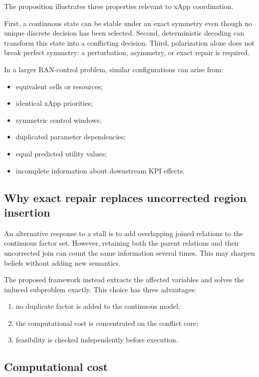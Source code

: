 \documentclass[pdflatex,sn-mathphys-num,iicol,oneside]{sn-jnl}
\begin{document}
The proposition illustrates three properties relevant to xApp
coordination.

First, a continuous state can be stable under an exact symmetry even
though no unique discrete decision has been selected. Second,
deterministic decoding can transform this state into a conflicting
decision. Third, polarization alone does not break perfect symmetry:
a perturbation, asymmetry, or exact repair is required.

In a larger RAN-control problem, similar configurations can arise
from:

\begin{itemize}
    \item equivalent cells or resources;
    \item identical xApp priorities;
    \item symmetric control windows;
    \item duplicated parameter dependencies;
    \item equal predicted utility values;
    \item incomplete information about downstream KPI effects.
\end{itemize}

\subsection{Why exact repair replaces uncorrected region insertion}

An alternative response to a stall is to add overlapping joined
relations to the continuous factor set. However, retaining both the
parent relations and their uncorrected join can count the same
information several times. This may sharpen beliefs without adding
new semantics.

The proposed framework instead extracts the affected variables and
solves the induced subproblem exactly. This choice has three
advantages:

\begin{enumerate}
    \item no duplicate factor is added to the continuous model;
    \item the computational cost is concentrated on the conflict core;
    \item feasibility is checked independently before execution.
\end{enumerate}

\subsection{Computational cost}
\end{document}
